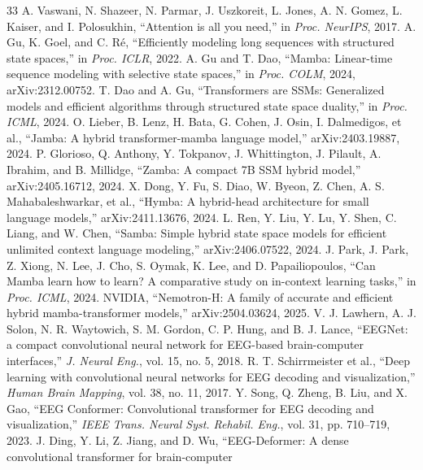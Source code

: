 \documentclass[conference]{IEEEtran}
\begin{document}
\begin{thebibliography}{33}
 A. Vaswani, N. Shazeer, N. Parmar, J. Uszkoreit,
L. Jones, A. N. Gomez, L. Kaiser, and I. Polosukhin, ``Attention is all you
need,'' in \emph{Proc. NeurIPS}, 2017.
 A. Gu, K. Goel, and C. R\'e, ``Efficiently modeling long
sequences with structured state spaces,'' in \emph{Proc. ICLR}, 2022.
 A. Gu and T. Dao, ``Mamba: Linear-time sequence
modeling with selective state spaces,'' in \emph{Proc. COLM}, 2024,
arXiv:2312.00752.
 T. Dao and A. Gu, ``Transformers are SSMs: Generalized
models and efficient algorithms through structured state space duality,'' in
\emph{Proc. ICML}, 2024.
 O. Lieber, B. Lenz, H. Bata, G. Cohen, J. Osin,
I. Dalmedigos, et al., ``Jamba: A hybrid transformer-mamba language model,''
arXiv:2403.19887, 2024.
 P. Glorioso, Q. Anthony, Y. Tokpanov,
J. Whittington, J. Pilault, A. Ibrahim, and B. Millidge, ``Zamba: A compact
7B SSM hybrid model,'' arXiv:2405.16712, 2024.
 X. Dong, Y. Fu, S. Diao, W. Byeon, Z. Chen,
A. S. Mahabaleshwarkar, et al., ``Hymba: A hybrid-head architecture for
small language models,'' arXiv:2411.13676, 2024.
 L. Ren, Y. Liu, Y. Lu, Y. Shen, C. Liang, and
W. Chen, ``Samba: Simple hybrid state space models for efficient unlimited
context language modeling,'' arXiv:2406.07522, 2024.
 J. Park, J. Park, Z. Xiong, N. Lee, J. Cho,
S. Oymak, K. Lee, and D. Papailiopoulos, ``Can Mamba learn how to learn? A
comparative study on in-context learning tasks,'' in \emph{Proc. ICML}, 2024.
 NVIDIA, ``Nemotron-H: A family of accurate and
efficient hybrid mamba-transformer models,'' arXiv:2504.03624, 2025.
 V. J. Lawhern, A. J. Solon, N. R. Waytowich,
S. M. Gordon, C. P. Hung, and B. J. Lance, ``EEGNet: a compact convolutional
neural network for EEG-based brain-computer interfaces,'' \emph{J. Neural
Eng.}, vol. 15, no. 5, 2018.
 R. T. Schirrmeister et al., ``Deep learning with
convolutional neural networks for EEG decoding and visualization,''
\emph{Human Brain Mapping}, vol. 38, no. 11, 2017.
 Y. Song, Q. Zheng, B. Liu, and X. Gao, ``EEG
Conformer: Convolutional transformer for EEG decoding and visualization,''
\emph{IEEE Trans. Neural Syst. Rehabil. Eng.}, vol. 31, pp. 710--719, 2023.
 J. Ding, Y. Li, Z. Jiang, and D. Wu,
``EEG-Deformer: A dense convolutional transformer for brain-computer

\end{thebibliography}
\end{document}
